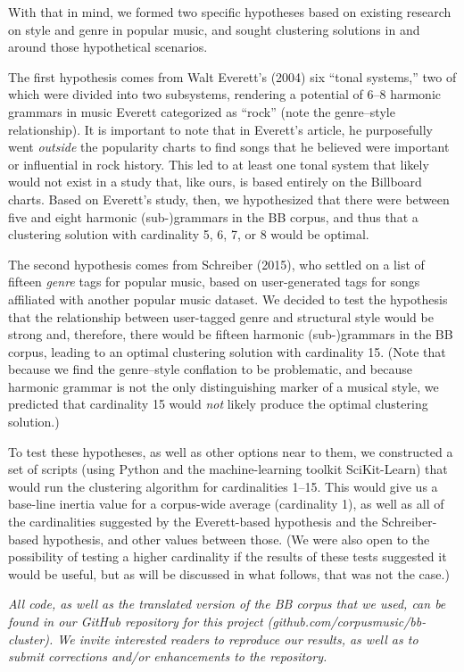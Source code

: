 With that in mind, we formed two specific hypotheses based on existing research on style and genre in popular music, and sought clustering solutions in and around those hypothetical scenarios.

The first hypothesis comes from Walt Everett's (2004) six ``tonal systems,'' two of which were divided into two subsystems, rendering a potential of 6–8 harmonic grammars in music Everett categorized as ``rock'' (note the genre–style relationship). It is important to note that in Everett's article, he purposefully went \emph{outside} the popularity charts to find songs that he believed were important or influential in rock history. This led to at least one tonal system that likely would not exist in a study that, like ours, is based entirely on the Billboard charts. Based on Everett's study, then, we hypothesized that there were between five and eight harmonic (sub-)grammars in the BB corpus, and thus that a clustering solution with cardinality 5, 6, 7, or 8 would be optimal.

The second hypothesis comes from Schreiber (2015), who settled on a list of fifteen \emph{genre} tags for popular music, based on user-generated tags for songs affiliated with another popular music dataset. We decided to test the hypothesis that the relationship between user-tagged genre and structural style would be strong and, therefore, there would be fifteen harmonic (sub-)grammars in the BB corpus, leading to an optimal clustering solution with cardinality 15. (Note that because we find the genre–style conflation to be problematic, and because harmonic grammar is not the only distinguishing marker of a musical style, we predicted that cardinality 15 would \emph{not} likely produce the optimal clustering solution.)

To test these hypotheses, as well as other options near to them, we constructed a set of scripts (using Python and the machine-learning toolkit SciKit-Learn) that would run the clustering algorithm for cardinalities 1–15. This would give us a base-line inertia value for a corpus-wide average (cardinality 1), as well as all of the cardinalities suggested by the Everett-based hypothesis and the Schreiber-based hypothesis, and other values between those. (We were also open to the possibility of testing a higher cardinality if the results of these tests suggested it would be useful, but as will be discussed in what follows, that was not the case.)

\emph{All code, as well as the translated version of the BB corpus that we used, can be found in our GitHub repository for this project (github.com\slash corpusmusic\slash bb-cluster). We invite interested readers to reproduce our results, as well as to submit corrections and\slash or enhancements to the repository.}

